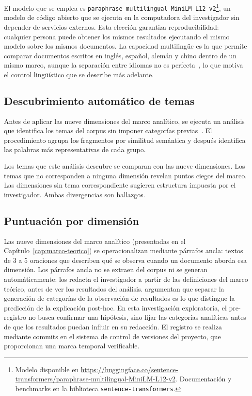 El modelo que se emplea es \texttt{paraphrase-multilingual-MiniLM-L12-v2}\footnote{Modelo disponible en \url{https://huggingface.co/sentence-transformers/paraphrase-multilingual-MiniLM-L12-v2}. Documentación y benchmarks en la biblioteca \texttt{sentence-transformers}.}, un modelo de código abierto que se ejecuta en la computadora del investigador sin depender de servicios externos. Esta elección garantiza reproducibilidad: cualquier persona puede obtener los mismos resultados ejecutando el mismo modelo sobre los mismos documentos. La capacidad multilingüe es la que permite comparar documentos escritos en inglés, español, alemán y chino dentro de un mismo marco, aunque la separación entre idiomas no es perfecta~\citep{conneau2020unsupervised}, lo que motiva el control lingüístico que se describe más adelante.

\subsection{Descubrimiento automático de temas}

Antes de aplicar las nueve dimensiones del marco analítico, se ejecuta un análisis que identifica los temas del corpus sin imponer categorías previas~\citep{grootendorst2022bertopic}. El procedimiento agrupa los fragmentos por similitud semántica y después identifica las palabras más representativas de cada grupo.

Los temas que este análisis descubre se comparan con las nueve dimensiones. Los temas que no corresponden a ninguna dimensión revelan puntos ciegos del marco. Las dimensiones sin tema correspondiente sugieren estructura impuesta por el investigador. Ambas divergencias son hallazgos.

\subsection{Puntuación por dimensión}

Las nueve dimensiones del marco analítico (presentadas en el Capítulo~\ref{cap:marco-teorico}) se operacionalizan mediante párrafos ancla: textos de 3 a 5 oraciones que describen qué se observa cuando un documento aborda esa dimensión. Los párrafos ancla no se extraen del corpus ni se generan automáticamente: los redacta el investigador a partir de las definiciones del marco teórico, antes de ver los resultados del análisis. \citet{nosek2018preregistration} argumentan que separar la generación de categorías de la observación de resultados es lo que distingue la predicción de la explicación post-hoc. En esta investigación exploratoria, el pre-registro no busca confirmar una hipótesis, sino fijar las categorías analíticas antes de que los resultados puedan influir en su redacción. El registro se realiza mediante commits en el sistema de control de versiones del proyecto, que proporcionan una marca temporal verificable.

